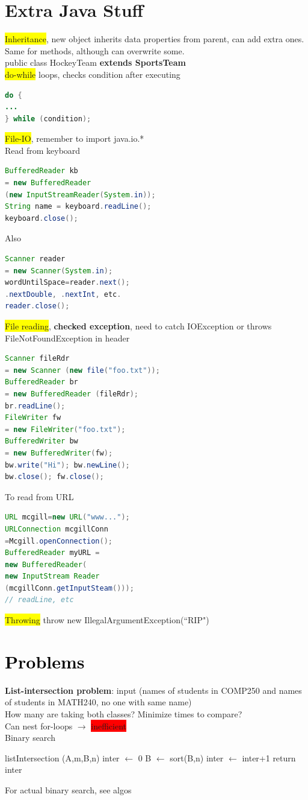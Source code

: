 \section{\textcolor{Bittersweet}{Extra Java Stuff}}
\colorbox{Yellow}{Inheritance}, new object inherits data properties from parent, can add extra ones. Same for methods, although can overwrite some.
\\ public class HockeyTeam \textbf{extends SportsTeam}
\\ \colorbox{Yellow}{do-while} loops, checks condition after executing
\begin{lstlisting}[language=java]
do {
...
} while (condition);
\end{lstlisting}
\colorbox{Yellow}{File-IO}, remember to import java.io.*
\\ Read from keyboard
\begin{lstlisting}[language=java]
BufferedReader kb 
= new BufferedReader
(new InputStreamReader(System.in));
String name = keyboard.readLine();
keyboard.close();
\end{lstlisting}
Also
\begin{lstlisting}[language=java]
Scanner reader 
= new Scanner(System.in);
wordUntilSpace=reader.next();
.nextDouble, .nextInt, etc.
reader.close();
\end{lstlisting}
\colorbox{Yellow}{File reading}, \textbf{checked exception}, need to catch IOException or throws FileNotFoundException in header
\begin{lstlisting}[language=java]
Scanner fileRdr 
= new Scanner (new file("foo.txt"));
BufferedReader br 
= new BufferedReader (fileRdr);
br.readLine();
FileWriter fw 
= new FileWriter("foo.txt");
BufferedWriter bw 
= new BufferedWriter(fw);
bw.write("Hi"); bw.newLine();
bw.close(); fw.close();
\end{lstlisting}
To read from URL
\begin{lstlisting}[language=java]
URL mcgill=new URL("www...");
URLConnection mcgillConn
=Mcgill.openConnection();
BufferedReader myURL =
new BufferedReader(
new InputStream Reader
(mcgillConn.getInputSteam()));
// readLine, etc
\end{lstlisting}
\colorbox{Yellow}{Throwing} throw new IllegalArgumentException(``RIP")
\color{Black}
\section{\textcolor{Black}{Problems}}
\textbf{List-intersection problem}: input (names of students in COMP250 and names of students in MATH240, no one with same name)
\\ How many are taking both classes? Minimize times to compare?
\\ Can nest for-loops $\to$ \colorbox{Red}{inefficient}
\\ Binary search
\begin{algorithmic}
	\State listIntersection (A,m,B,n)
	\State inter $\gets$ 0
	\State B $\gets$ sort(B,n)
	\State inter $\gets$ inter+1
	\EndIf
	\EndFor
	\State return inter
\end{algorithmic}
For actual binary search, see algos
